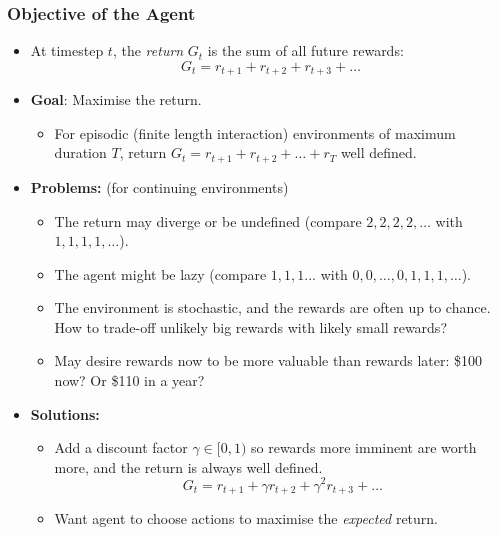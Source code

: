 \documentclass[10pt,a4paper, handout]{beamer}
\begin{document}
\begin{frame}
	\frametitle{Objective of the Agent}
	
	\begin{itemize}
		\item At timestep $t$, the \textit{return} $G_t$ is the sum
		of all future rewards:
		$$
		G_t = r_{t+1} + r_{t+2} + r_{t+3} + \ldots 
		$$
		\pause
		\item \textbf{Goal}: Maximise the return.
		\pause
		\begin{itemize}
			\item For episodic  
			(finite length interaction) environments of maximum duration $T$,
			return $G_t = r_{t+1} + r_{t+2} + \ldots + r_T$ well defined.   
		\end{itemize}
		\pause
		\item \textbf{Problems:} (for continuing environments)
		\begin{itemize}
			\item The return may diverge or be undefined
			(compare $2,2,2,2,\ldots$ with $1,1,1,1,\ldots$).
			\item The agent might be lazy (compare $1,1,1\ldots$
			with $0,0,\ldots, 0, 1,1,1,\ldots$).
			\item The environment is stochastic, and the rewards are often
			up to chance. How to trade-off unlikely big rewards with
			likely small rewards?
			\item May desire rewards now to be more valuable than rewards later:
			\$100 now? Or \$110 in a year?
		\end{itemize}
		\pause
		\item \textbf{Solutions:} 
		\begin{itemize}
			\item Add a discount factor $\gamma \in [0, 1)$
			so rewards more imminent are worth more, and the
			return is always well defined.
			$$
			G_t = r_{t+1} + \gamma r_{t+2} + \gamma^2 r_{t+3} + \ldots 
			$$
			\item Want agent to choose actions to
			maximise the \textit{expected} return.
		\end{itemize}
		
	\end{itemize}
\end{frame}
\end{document}
